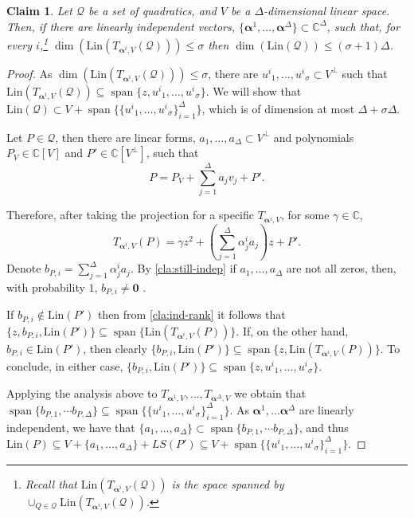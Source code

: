 \documentclass[10pt,a4paper]{article}
\newtheorem{claim}[theorem]{Claim}
\newcommand{\vecalpha}{\boldsymbol{\alpha}}
\renewcommand{\vec}[1]{{\mathbf{#1}}}
\newcommand{\vaa}{{\vecalpha}}
\renewcommand{\C}{\mathbb{C}}
\newcommand{\cQ}{{\mathcal{Q}}}
\newcommand{\MVar}[2]{{#1}_1,\ldots, {#1}_{#2}}
\newcommand{\spn}[1]{\operatorname{span}\{{#1}\}}
\newcommand{\MS}{\text{Lin}}
\begin{document}
\begin{claim}\label{cla:z-map-dimension}
Let $\cQ$ be a set of quadratics, and $V$ be a $\Delta$-dimensional linear space. Then, if there are linearly independent vectors, $\{\vaa^1,\dots, \vaa^{\Delta}  \}\subset \C^{\Delta}$, such that, for every $i$,\footnote{Recall that $\MS(T_{\vaa^i,V}(\cQ))$ is the space spanned by $\cup_{Q\in\cQ}\MS(T_{\vaa^i,V}(\cQ))$.} $\dim(\MS(T_{\vaa^i,V}(\cQ)))\leq \sigma$ then $\dim(\MS(\cQ))\leq (\sigma+1) \Delta$.
\end{claim}
\begin{proof}
As $\dim(\MS(T_{\vaa^i,V}(\cQ)))\leq \sigma$, there are $\MVar{u^i}{\sigma} \subset V^{\perp}$ such that $\MS(T_{\vaa^i,V}(\cQ)) \subseteq \spn{z,\MVar{u^i}{\sigma} }$. We will show that $\MS(\cQ) \subset V + \spn{\{\MVar{u^i}{\sigma}\}_{i=1}^{\Delta}}$, which is of dimension at most $\Delta+ \sigma\Delta$.

Let $P \in \cQ$, then there are linear forms, $\MVar{a}{\Delta} \subset V^{\perp}$ and polynomials $P_{V} \in  \C[V]$ and $P'\in \C[V^{\perp}]$, such that
\begin{equation*}
P = P_{V}  + \sum\limits_{j=1}^{\Delta} a_jv_j + P'.
\end{equation*}

Therefore, after taking the projection for a specific $T_{\vaa^i, V}$, for some $\gamma \in \C$,
\begin{equation*}
T_{\vaa^i,V}(P) = \gamma z^2 + \left(\sum\limits_{j=1}^{\Delta} \alpha^i_ja_j\right) z + P'.
\end{equation*}
Denote $b_{P,i} = \sum\limits_{j=1}^{\Delta} \alpha^i_ja_j$. By \autoref{cla:still-indep} if $\MVar{a}{\Delta}$ are not all zeros, then, with probability $1$, $b_{P,i} \neq \vec{0}$ .

If $b_{P,i}\notin \MS(P')$ then from \autoref{cla:ind-rank} it follows that  $\lbrace z, b_{P,i}, \MS(P')\rbrace \subseteq \spn{ \MS(T_{\vaa^i,V}(P))}$. If, on the other hand, $b_{P,i} \in \MS(P')$, then clearly $\lbrace b_{P,i}, \MS(P')\rbrace \subseteq \spn{ z, \MS(T_{\vaa^i,V}(P))}$. To conclude, in either case, $\{b_{P,i},\MS(P')\} \subseteq \spn{z, \MVar{u^i}{\sigma}}.$

Applying the analysis above to $T_{\vaa^1,V},\dots,T_{\vaa^{\Delta},V}$ we obtain that $\spn{b_{P,1}, \cdots b_{P,\Delta}}\subseteq \spn{\{\MVar{u^i}{\sigma}\}_{i=1}^{\Delta}}$. As $\vaa^1,\dots\vaa^\Delta$ are linearly independent, we have that $\{{\MVar{a}{\Delta}}\} \subset \spn{b_{P,1}, \cdots b_{P,\Delta}}$, and thus $\MS(P) \subseteq V + \lbrace\MVar{a}{\Delta}\rbrace + LS(P') \subseteq V + \spn{\{\MVar{u^i}{\sigma}\}_{i=1}^{\Delta}}$.
\end{proof}
\end{document}
